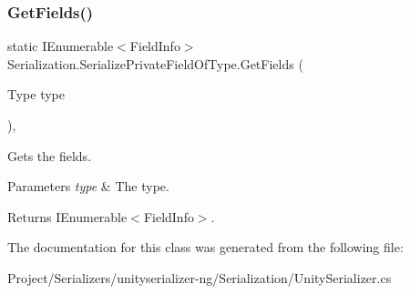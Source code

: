 \subsubsection{\texorpdfstring{Get\+Fields()}{GetFields()}}
{\footnotesize\ttfamily static I\+Enumerable$<$Field\+Info$>$ Serialization.\+Serialize\+Private\+Field\+Of\+Type.\+Get\+Fields (\begin{DoxyParamCaption}\item[{Type}]{type }\end{DoxyParamCaption})\hspace{0.3cm}{\ttfamily [inline]}, {\ttfamily [static]}}



Gets the fields. 


\begin{DoxyParams}{Parameters}
{\em type} & The type.\\
\hline
\end{DoxyParams}
\begin{DoxyReturn}{Returns}
I\+Enumerable$<$Field\+Info$>$.
\end{DoxyReturn}


The documentation for this class was generated from the following file\+:\begin{DoxyCompactItemize}
\item 
Project/\+Serializers/unityserializer-\/ng/\+Serialization/Unity\+Serializer.\+cs\end{DoxyCompactItemize}

